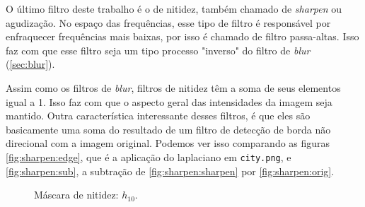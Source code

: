O último filtro deste trabalho é o de nitidez, também chamado de \textit{sharpen} ou agudização. No espaço das frequências, esse tipo de filtro é responsável por enfraquecer frequências mais baixas, por isso é chamado de filtro passa-altas. Isso faz com que esse filtro seja um tipo processo "inverso" do filtro de \textit{blur} (\cref{sec:blur}).

Assim como os filtros de \textit{blur}, filtros de nitidez têm a soma de seus elementos igual a 1. Isso faz com que o aspecto geral das intensidades da imagem seja mantido. Outra característica interessante desses filtros, é que eles são basicamente uma soma do resultado de um filtro de detecção de borda não direcional com a imagem original. Podemos ver isso comparando as figuras \ref{fig:sharpen:edge}, que é a aplicação do laplaciano em \texttt{city.png}, e \ref{fig:sharpen:sub}, a subtração de \cref{fig:sharpen:sharpen} por \ref{fig:sharpen:orig}.

\begin{figure}[H]
    \centering
    

    \caption{Máscara de nitidez: $h_{10}$.}
    \label{fig:h10}
\end{figure}

